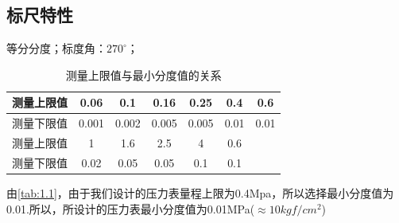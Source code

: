\subsection{标尺特性}
等分分度；标度角：$270^{\circ}$；
\begin{table}[!htbp]
    \centering
\caption{测量上限值与最小分度值的关系}
\label{tab:1.1}
    \begin{tabular}{|c|c|c|c|c|c|c|} \hline 
         测量上限值&0.06&0.1&0.16&0.25&0.4&0.6\\ \hline 
         测量下限值&0.001&0.002&0.005&0.005&0.01&0.01\\ \hline 
         测量上限值&1&1.6&2.5&4&0.6& \\ \hline 
         测量下限值&0.02&0.05&0.05&0.1&0.1& \\ \hline
    \end{tabular}
\end{table}
\newline

由\autoref{tab:1.1}，由于我们设计的压力表量程上限为0.4Mpa，所以选择最小分度值为0.01.所以，所设计的压力表最小分度值为0.01MPa(${\approx}10kgf/cm^2$)
